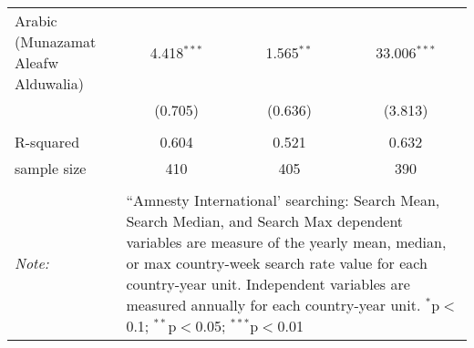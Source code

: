 \begin{table}[!htbp]
\begin{tabular}{@{\extracolsep{5pt}}lccc}
  Arabic (Munazamat Aleafw Alduwalia) & 4.418$^{***}$ & 1.565$^{**}$ & 33.006$^{***}$ \\ 
  & (0.705) & (0.636) & (3.813) \\ 
 \hline \\[-1.8ex] 
R-squared  & 0.604 & 0.521 & 0.632 \\ 
sample size  & 410 & 405 & 390 \\ 
\hline 
\hline \\[-1.8ex] 
\textit{Note:}  & \multicolumn{3}{l}{\parbox[t]{8cm}{``Amnesty International' searching: Search Mean, Search Median, and Search Max dependent variables are measure of the yearly mean, median, or max country-week search rate value for each country-year unit. Independent variables are measured annually for each country-year unit. $^{*}$p$<$0.1; $^{**}$p$<$0.05; $^{***}$p$<$0.01}} \\ 
\end{tabular} 
\end{table} 
